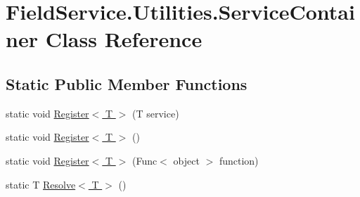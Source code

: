 \hypertarget{class_field_service_1_1_utilities_1_1_service_container}{\section{Field\+Service.\+Utilities.\+Service\+Container Class Reference}
\label{class_field_service_1_1_utilities_1_1_service_container}
}
\subsection*{Static Public Member Functions}
\begin{DoxyCompactItemize}
\item 
static void \hyperlink{class_field_service_1_1_utilities_1_1_service_container_a803e3ed35c9f4e47cfee9f933ad4779d}{Register$<$ T $>$} (T service)
\item 
static void \hyperlink{class_field_service_1_1_utilities_1_1_service_container_a4c5d494618cff770408a700a7e246b48}{Register$<$ T $>$} ()
\item 
static void \hyperlink{class_field_service_1_1_utilities_1_1_service_container_a6c59db70d9f67fae55721ff3dc72b0e8}{Register$<$ T $>$} (Func$<$ object $>$ function)
\item 
static T \hyperlink{class_field_service_1_1_utilities_1_1_service_container_ad67957b240d4099ae3c1c03f25f14f3d}{Resolve$<$ T $>$} ()
\end{DoxyCompactItemize}


